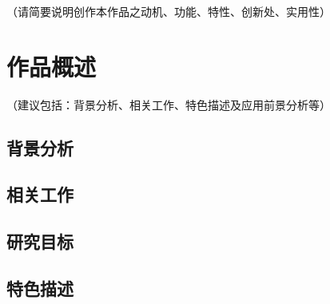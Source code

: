 \documentclass{cumcmthesis}
\numberwithin{equation}{section} %
\numberwithin{figure}{section} %
\numberwithin{table}{section} %
\begin{document}
	
\normalem

\maketitle
 
\newpage
\thispagestyle{empty}
\tableofcontents
\newpage
 
\thispagestyle{empty}
\listoffigures
\newpage

\thispagestyle{empty}
\listoftables
\newpage

\setcounter{page}{1}
 
\begin{cnabstract}
	
（请简要说明创作本作品之动机、功能、特性、创新处、实用性）

	
\end{cnabstract}

\begin{enabstract}


\end{enabstract}

\section{作品概述}

（建议包括：背景分析、相关工作、特色描述及应用前景分析等） 

\subsection{背景分析}

\subsection{相关工作}

\subsection{研究目标}

\subsection{特色描述}
\end{document}
